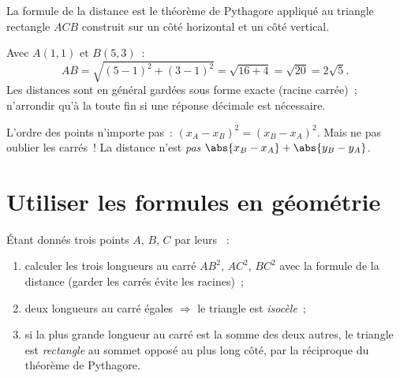 \begin{omfigure}

{\small La formule de la distance est le théorème de Pythagore appliqué
au triangle rectangle $ACB$ construit sur un côté horizontal et un côté
vertical.}
\end{omfigure}

\begin{example}\label{ex:g10:coordgeom:distance}
Avec $A(1, 1)$ et $B(5, 3)$~:
\[
AB = \sqrt{(5-1)^2 + (3-1)^2} = \sqrt{16 + 4} = \sqrt{20} = 2\sqrt 5 .
\]
Les distances sont en général gardées sous forme exacte (racine carrée)~;
n'arrondir qu'à la toute fin si une réponse décimale est nécessaire.
\end{example}

\begin{remark}
L'ordre des points n'importe pas~: $(x_A - x_B)^2 = (x_B - x_A)^2$. Mais
ne pas oublier les carrés~! La distance n'est \emph{pas}
$\abs{x_B - x_A} + \abs{y_B - y_A}$.
\end{remark}

\section{Utiliser les formules en géométrie}

\begin{method}\label{met:g10:coordgeom:triangle}
Étant donnés trois points $A$, $B$, $C$ par leurs ~:
\begin{enumerate}
  \item calculer les trois longueurs au carré $AB^2$, $AC^2$, $BC^2$ avec
        la formule de la distance (garder les carrés évite les racines)~;
  \item deux longueurs au carré égales $\Rightarrow$ le triangle est
        \emph{isocèle}~;
  \item si la plus grande longueur au carré est la somme des deux
        autres, le triangle est \emph{rectangle} au sommet opposé au plus
        long côté, par la réciproque du théorème de Pythagore.
\end{enumerate}
\end{method}

